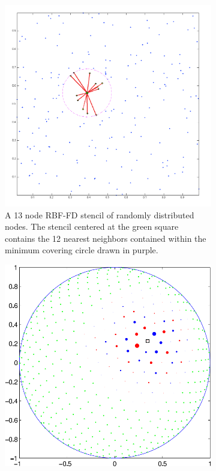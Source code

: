\documentclass[11pt]{report}
\begin{document}
{\begin{figure}[htbp]
	\centering
	\begin{subfigure}[m]{0.6\textwidth}
		\centering
		\includegraphics[width=1.0\textwidth]{../figures/chapter2/preview_stencils_example.png}
		\caption{A 13 node RBF-FD stencil of randomly distributed nodes. The stencil centered at the green square contains the 12 nearest neighbors contained within the minimum covering circle drawn in purple.}
		\label{fig:stencil_example_random}
	\end{subfigure}
	\begin{subfigure}[m]{0.35\textwidth}
		\centering
		\includegraphics[width=1.0\textwidth]{../figures/chapter2/RBFFD_single-eps-converted-to.pdf}

\end{subfigure}
\end{figure}}
\end{document}
